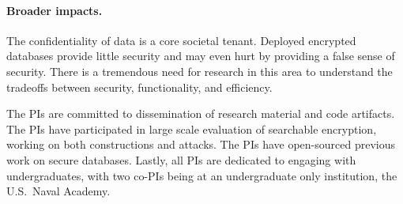 \documentclass[11pt]{article}
\begin{document}
\paragraph{Broader impacts.}
The confidentiality of data is a core societal tenant.  Deployed encrypted
databases provide little security and may even hurt by providing a false sense
of security.  There is a tremendous need for research in this area to
understand the tradeoffs between security, functionality, and efficiency.

The PIs are committed to dissemination of research material and code artifacts.  The PIs
have participated in large scale evaluation of searchable encryption, working
on both constructions and attacks.  The PIs have open-sourced
previous work on secure databases.  Lastly, all PIs are
dedicated to engaging with undergraduates, with two co-PIs being at an
undergraduate only institution, the U.S.\ Naval Academy.  
\end{document}
